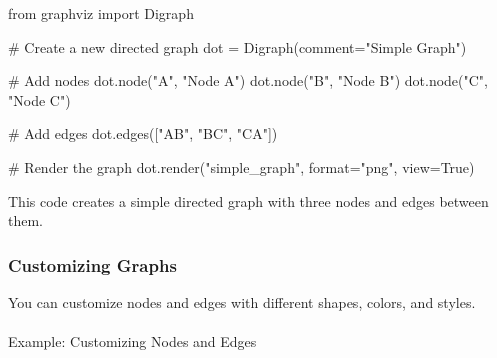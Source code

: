 \documentclass[
  letterpaper,
  DIV=11,
  numbers=noendperiod]{scrreprt}
\makeatletter
\let\oldparagraph\paragraph
\renewcommand{\paragraph}{
    \@ifstar
      \xxxParagraphStar
      \xxxParagraphNoStar
  }
\newcommand{\xxxParagraphStar}[1]{\oldparagraph*{#1}\mbox{}}
\newcommand{\xxxParagraphNoStar}[1]{\oldparagraph{#1}\mbox{}}
\newenvironment{Shaded}{\begin{snugshade}}{\end{snugshade}}
\newcommand{\BuiltInTok}[1]{\textcolor[rgb]{0.00,0.23,0.31}{#1}}
\newcommand{\CommentTok}[1]{\textcolor[rgb]{0.37,0.37,0.37}{#1}}
\newcommand{\ImportTok}[1]{\textcolor[rgb]{0.00,0.46,0.62}{#1}}
\newcommand{\NormalTok}[1]{\textcolor[rgb]{0.00,0.23,0.31}{#1}}
\newcommand{\OperatorTok}[1]{\textcolor[rgb]{0.37,0.37,0.37}{#1}}
\newcommand{\StringTok}[1]{\textcolor[rgb]{0.13,0.47,0.30}{#1}}
\newcommand{\VariableTok}[1]{\textcolor[rgb]{0.07,0.07,0.07}{#1}}
\makeatother
\begin{document}
\begin{Shaded}
\begin{Highlighting}[]
\ImportTok{from}\NormalTok{ graphviz }\ImportTok{import}\NormalTok{ Digraph}

\CommentTok{\# Create a new directed graph}
\NormalTok{dot }\OperatorTok{=}\NormalTok{ Digraph(comment}\OperatorTok{=}\StringTok{"Simple Graph"}\NormalTok{)}

\CommentTok{\# Add nodes}
\NormalTok{dot.node(}\StringTok{"A"}\NormalTok{, }\StringTok{"Node A"}\NormalTok{)}
\NormalTok{dot.node(}\StringTok{"B"}\NormalTok{, }\StringTok{"Node B"}\NormalTok{)}
\NormalTok{dot.node(}\StringTok{"C"}\NormalTok{, }\StringTok{"Node C"}\NormalTok{)}

\CommentTok{\# Add edges}
\NormalTok{dot.edges([}\StringTok{"AB"}\NormalTok{, }\StringTok{"BC"}\NormalTok{, }\StringTok{"CA"}\NormalTok{])}

\CommentTok{\# Render the graph}
\NormalTok{dot.render(}\StringTok{"simple\_graph"}\NormalTok{, }\BuiltInTok{format}\OperatorTok{=}\StringTok{"png"}\NormalTok{, view}\OperatorTok{=}\VariableTok{True}\NormalTok{)}
\end{Highlighting}
\end{Shaded}

This code creates a simple directed graph with three nodes and edges
between them.

\subsubsection{Customizing Graphs}\label{customizing-graphs}

You can customize nodes and edges with different shapes, colors, and
styles.

\paragraph{Example: Customizing Nodes and
Edges}\label{example-customizing-nodes-and-edges}
\end{document}
